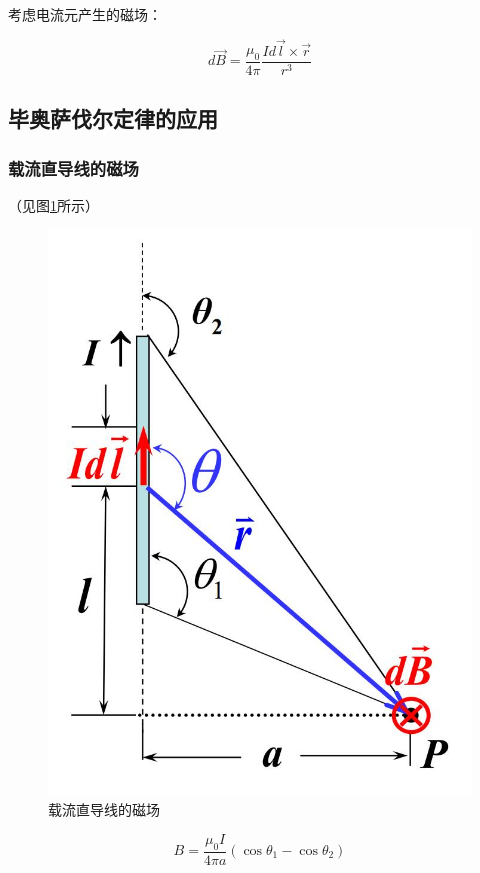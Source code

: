 \documentclass{ctexart}
\begin{document}
考虑电流元产生的磁场：

$$d\vec{B}=\frac{\mu_0}{4\pi}\frac{Id\vec{l}\times \vec{r}}{r^3}$$

\subsection{毕奥萨伐尔定律的应用}

\subsubsection{载流直导线的磁场}

（见图\ref{figure12.1}所示）

\begin{figure}[h]
	\centering
	\includegraphics[scale=0.4]{images//chapter_12//figure_12.1.jpg} 
	\caption{载流直导线的磁场}\label{figure12.1}
\end{figure}

$$B=\frac{\mu_0I}{4\pi a}(\cos\theta_1-\cos\theta_2)$$
\end{document}
